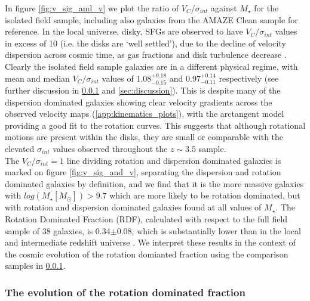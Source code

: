 \documentclass[fleqn,usenatbib]{mn2e}
\begin{document}
In figure \ref{fig:v_sig_and_v} we plot the ratio of $V_{C}$/$\sigma_{int}$ against $M_{\star}$ for the isolated field sample, including also galaxies from the AMAZE Clean sample for reference.
In the local universe, disky, SFGs are observed to have $V_{C}/\sigma_{int}$ values in excess of 10 (i.e. the disks are `well settled'), due to the decline of velocity dispersion across cosmic time, as gas fractions and disk turbulence decrease \citep[e.g.][]{Epinat2008,Epinat2008a}.
Clearly the isolated field sample galaxies are in a different physical regime, with mean and median $V_{C}/\sigma_{int}$ values of $1.08^{+0.18}_{-0.15}$ and $0.97^{+0.14}_{-0.11}$ respectively (see further discussion in \cref{subsubsec:RDF_evolution} and \cref{sec:discussion}).
This is despite many of the dispersion dominated galaxies showing clear velocity gradients across the observed velocity maps (\cref{app:kinematics_plots}), with the arctangent model providing a good fit to the rotation curves.
This suggests that although rotational motions are present within the disks, they are small or comparable with the elevated $\sigma_{int}$ values observed throughout the $z \sim 3.5$ sample. \\

The $V_{C}$/$\sigma_{int}=1$ line dividing rotation and dispersion dominated galaxies is marked on figure \ref{fig:v_sig_and_v}, separating the dispersion and rotation dominated galaxies by definition, and we find that it is the more massive galaxies with $log(M_{\star}[M_{\odot}]) > 9.7$ which are more likely to be rotation dominated, but with rotation and dispersion dominated galaxies found at all values of $M_{\star}$.
The Rotation Dominated Fraction (RDF), calculated with respect to the full field sample of 38 galaxies, is 0.34$\pm0.08$, which is substantially lower than in the local and intermediate redshift universe \citep[e.g.][]{Epinat2008a,Epinat2008,Green2014}.
We interpret these results in the context of the cosmic evolution of the rotation domianted fraction using the comparison samples in \cref{subsubsec:RDF_evolution}.\\

\subsubsection{The evolution of the rotation dominated fraction}\label{subsubsec:RDF_evolution}
\end{document}
